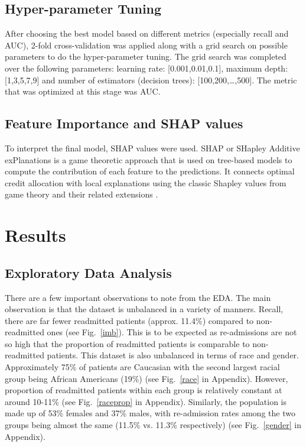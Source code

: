 \documentclass[letterpaper, 10 pt, conference]{ieeeconf}  %
\begin{document}
\subsection{Hyper-parameter Tuning}
After choosing the best model based on different metrics (especially recall and AUC), 2-fold cross-validation was applied along with a grid search on possible parameters to do the hyper-parameter tuning. The grid search was completed over the following parameters: learning rate: [0.001,0.01,0.1], maximum depth: [1,3,5,7,9] and number of estimators (decision trees): [100,200,\dots,500]. The metric that was optimized at this stage was AUC.

\subsection{Feature Importance and SHAP values}
To interpret the final model, SHAP values were used. SHAP or SHapley Additive exPlanations is a game theoretic approach that is used on tree-based models to compute the contribution of each feature to the predictions. It connects optimal credit allocation with local explanations using the classic Shapley values from game theory and their related extensions \cite{GitHub}. 

\section{Results}

\subsection{Exploratory Data Analysis}

There are a few important observations to note from the EDA. The main observation is that the dataset is unbalanced in a variety of manners. Recall, there are far fewer readmitted patients (approx. 11.4\%) compared to non-readmitted ones (see Fig.~\ref{imb}). This is to be expected as re-admissions are not so high that the proportion of readmitted patients is comparable to non-readmitted patients. This dataset is also unbalanced in terms of race and gender. Approximately 75\% of patients are Caucasian with the second largest racial group being African Americans (19\%) (see Fig.~\ref{race} in Appendix). However, proportion of readmitted patients within each group is relatively constant at around 10-11\% (see Fig.~\ref{raceprop} in Appendix). Similarly, the population is made up of 53\% females and 37\% males, with re-admission rates among the two groups being almost the same (11.5\% vs. 11.3\% respectively) (see Fig.~\ref{gender} in Appendix). 
\end{document}

